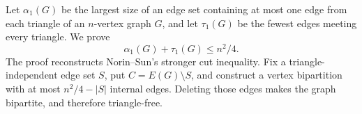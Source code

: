 Let $\alpha_1(G)$ be the largest size of an edge set containing at most one edge from each triangle of an $n$-vertex graph $G$, and let $\tau_1(G)$ be the fewest edges meeting every triangle. We prove
\[
 \alpha_1(G)+\tau_1(G)\le n^2/4.
\]
The proof reconstructs Norin--Sun's stronger cut inequality. Fix a triangle-independent edge set $S$, put $C=E(G)\setminus S$, and construct a vertex bipartition with at most $n^2/4-|S|$ internal edges. Deleting those edges makes the graph bipartite, and therefore triangle-free.
